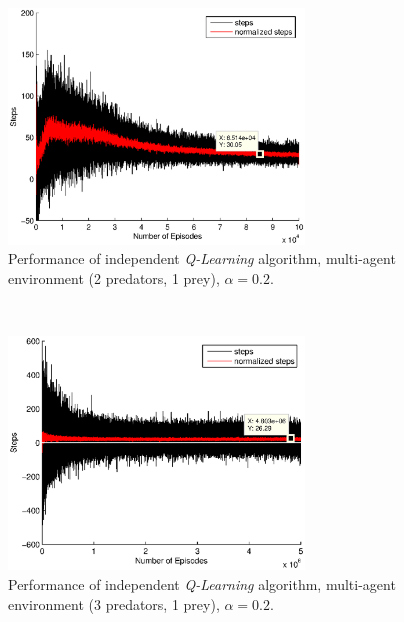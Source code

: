 \documentclass[a4paper,11pt]{article}
\begin{document}
\begin{figure}[ht!]
  \centering
	\includegraphics[width=0.7\textwidth]{figures/q202.eps}
    \caption{Performance of independent \textit{Q-Learning} algorithm, multi-agent environment (2 predators, 1 prey), $\alpha = 0.2$.}
    \label{q23}
\end{figure}
~
\begin{figure}[ht!]
  \centering
	\includegraphics[width=0.7\textwidth]{figures/iq3.eps}
    \caption{Performance of independent \textit{Q-Learning} algorithm, multi-agent environment (3 predators, 1 prey), $\alpha = 0.2$.}
    \label{q33}
\end{figure}
\end{document}
